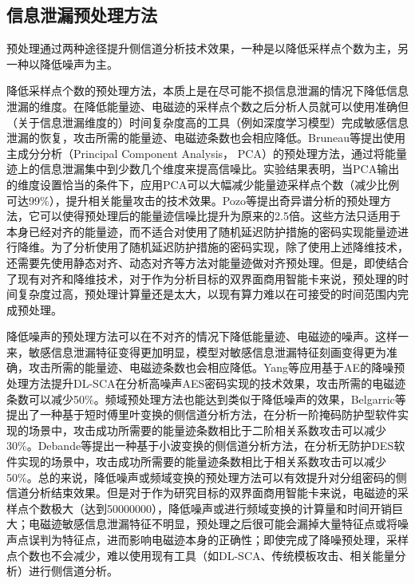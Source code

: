 {	\subsection{信息泄漏预处理方法}
	预处理通过两种途径提升侧信道分析技术效果，一种是以降低采样点个数为主，另一种以降低噪声为主。
	
	降低采样点个数的预处理方法，本质上是在尽可能不损信息泄漏的情况下降低信息泄漏的维度。在降低能量迹、电磁迹的采样点个数之后分析人员就可以使用准确但（关于信息泄漏维度的）时间复杂度高的工具（例如深度学习模型）完成敏感信息泄漏的恢复，攻击所需的能量迹、电磁迹条数也会相应降低。Bruneau等\citep{bruneau:hal-01218072}提出使用主成分分析（Principal Component Analysis， PCA）的预处理方法，通过将能量迹上的信息泄漏集中到少数几个维度来提高信噪比。实验结果表明，当PCA输出的维度设置恰当的条件下，应用PCA可以大幅减少能量迹采样点个数（减少比例可达99\%），提升相关能量攻击的技术效果。Pozo等\citep{Pozo15}提出奇异谱分析的预处理方法，它可以使得预处理后的能量迹信噪比提升为原来的2.5倍。这些方法只适用于本身已经对齐的能量迹，而不适合对使用了随机延迟防护措施的密码实现能量迹进行降维。为了分析使用了随机延迟防护措施的密码实现，除了使用上述降维技术，还需要先使用静态对齐\citep{Homma08}、动态对齐\citep{Woudenberg11}等方法对能量迹做对齐预处理。但是，即使结合了现有对齐和降维技术，对于作为分析目标的双界面商用智能卡来说，预处理的时间复杂度过高，预处理计算量还是太大，以现有算力难以在可接受的时间范围内完成预处理。
	
	降低噪声的预处理方法可以在不对齐的情况下降低能量迹、电磁迹的噪声。这样一来，敏感信息泄漏特征变得更加明显，模型对敏感信息泄漏特征刻画变得更为准确，攻击所需的能量迹、电磁迹条数也会相应降低。Yang等\citep{Yang19}应用基于AE的降噪预处理方法提升DL-SCA在分析高噪声AES密码实现的技术效果，攻击所需的电磁迹条数可以减少50\%。频域预处理方法也能达到类似于降低噪声的效果，Belgarric等\citep{Belgarric16}提出了一种基于短时傅里叶变换的侧信道分析方法，在分析一阶掩码防护型软件实现的场景中，攻击成功所需要的能量迹条数相比于二阶相关系数攻击可以减少30\%。Debande等\citep{Debande12}提出一种基于小波变换的侧信道分析方法，在分析无防护DES软件实现的场景中，攻击成功所需要的能量迹条数相比于相关系数攻击可以减少50\%。总的来说，降低噪声或频域变换的预处理方法可以有效提升对分组密码的侧信道分析结束效果。但是对于作为研究目标的双界面商用智能卡来说，电磁迹的采样点个数极大（达到50000000），降低噪声或进行频域变换的计算量和时间开销巨大；电磁迹敏感信息泄漏特征不明显，预处理之后很可能会漏掉大量特征点或将噪声点误判为特征点，进而影响电磁迹本身的正确性；即使完成了降噪预处理，采样点个数也不会减少，难以使用现有工具（如DL-SCA、传统模板攻击、相关能量分析）进行侧信道分析。
	
}
